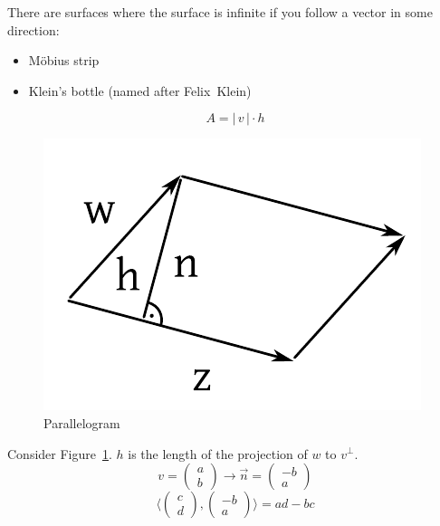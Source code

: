 \documentclass[a4paper,landscape,twocolumn]{article}
\newcommand\abs[1]{|\,#1\,|}
\theoremstyle{definition}
\begin{document}
There are surfaces where the surface is infinite if you follow a vector in some direction:
\begin{itemize}
  \item Möbius strip
  \item Klein's bottle (named after Felix~Klein)
\end{itemize}

\[ A = \abs{v} \cdot h \]

\begin{figure}[!h]
  \begin{center}
    \includegraphics{img/parallelogram.pdf}
    \caption{Parallelogram}
    \label{img:para}
  \end{center}
\end{figure}

Consider Figure~\ref{img:para}.
$h$ is the length of the projection of $w$ to $v^\bot$.
\[
  v = \begin{pmatrix} a \\ b \end{pmatrix}
  \to
  \vec{n} = \begin{pmatrix} -b \\ a \end{pmatrix}
\] \[
  \langle \begin{pmatrix} c \\ d \end{pmatrix}, \begin{pmatrix} -b \\ a \end{pmatrix} \rangle
  = ad - bc
\]
\end{document}
